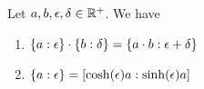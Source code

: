 \begin{theorem} \label{thm:multiplicative:rules}
  Let $a,b,\epsilon,\delta \in\Rplus$. We have

  \begin{enumerate}
    \item $\ean[\epsilon]{a} \cdot \ean[\delta]{b} = \ean[\epsilon+\delta]{a\cdot b}$
    \item $\ean[\epsilon]{a} = \an[\sinh(\epsilon)a]{\cosh(\epsilon)a}$
  \end{enumerate}
\end{theorem}
